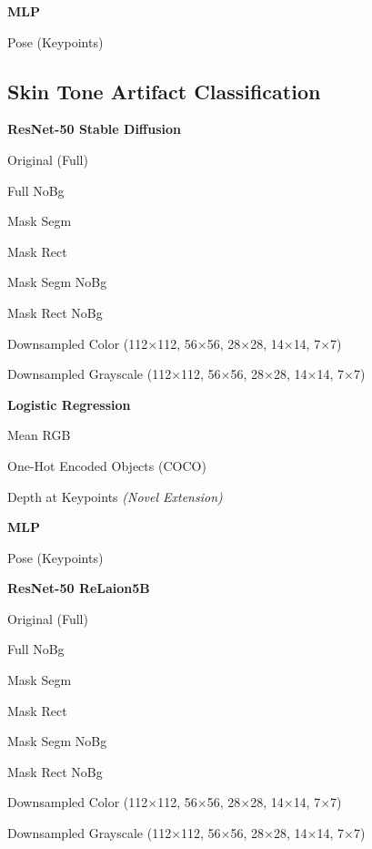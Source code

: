 \documentclass{article}
\newcommand{\todo}{\textcolor{red}{$\square$}}          %
\newcommand{\tbadded}{\textcolor{orange}{$\square$}}    %
\begin{document}
	\textbf{MLP}
	\begin{checklist}
		\item[\todo] Pose (Keypoints)
	\end{checklist}
	
	\newpage
	\subsection*{Skin Tone Artifact Classification}
	
	\noindent\textbf{ResNet-50 Stable Diffusion}
	\begin{checklist}
		\item[\todo] Original (Full)
		\item[\todo] Full NoBg
		\item[\todo] Mask Segm
		\item[\todo] Mask Rect
		\item[\todo] Mask Segm NoBg
		\item[\todo] Mask Rect NoBg
		\item[\tbadded] Downsampled Color (112$\times$112, 56$\times$56, 28$\times$28, 14$\times$14, 7$\times$7)
		\item[\tbadded] Downsampled Grayscale (112$\times$112, 56$\times$56, 28$\times$28, 14$\times$14, 7$\times$7)
	\end{checklist}
	
	\textbf{Logistic Regression}
	\begin{checklist}
		\item[\todo] Mean RGB
		\item[\todo] One-Hot Encoded Objects (COCO)
		\item[\todo] Depth at Keypoints \textit{(Novel Extension)}
	\end{checklist}
	
	\textbf{MLP}
	\begin{checklist}
		\item[\todo] Pose (Keypoints)
	\end{checklist}
	
	\noindent\textbf{ResNet-50 ReLaion5B}
	\begin{checklist}
		\item[\todo] Original (Full)
		\item[\todo] Full NoBg
		\item[\todo] Mask Segm
		\item[\todo] Mask Rect
		\item[\todo] Mask Segm NoBg
		\item[\todo] Mask Rect NoBg
		\item[\tbadded] Downsampled Color (112$\times$112, 56$\times$56, 28$\times$28, 14$\times$14, 7$\times$7)
		\item[\tbadded] Downsampled Grayscale (112$\times$112, 56$\times$56, 28$\times$28, 14$\times$14, 7$\times$7)
	\end{checklist}
	
\end{document}
